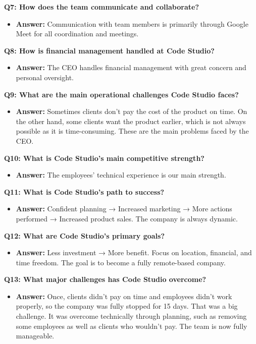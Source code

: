 \documentclass[12pt,a4paper]{article}
\begin{document}
\textbf{Q7: How does the team communicate and collaborate?}
\begin{itemize}
    \item \textbf{Answer:} Communication with team members is primarily through Google Meet for all coordination and meetings.
\end{itemize}

\textbf{Q8: How is financial management handled at Code Studio?}
\begin{itemize}
    \item \textbf{Answer:} The CEO handles financial management with great concern and personal oversight.
\end{itemize}

\textbf{Q9: What are the main operational challenges Code Studio faces?}
\begin{itemize}
    \item \textbf{Answer:} Sometimes clients don't pay the cost of the product on time. On the other hand, some clients want the product earlier, which is not always possible as it is time-consuming. These are the main problems faced by the CEO.
\end{itemize}

\textbf{Q10: What is Code Studio's main competitive strength?}
\begin{itemize}
    \item \textbf{Answer:} The employees' technical experience is our main strength.
\end{itemize}

\textbf{Q11: What is Code Studio's path to success?}
\begin{itemize}
    \item \textbf{Answer:} Confident planning → Increased marketing → More actions performed → Increased product sales. The company is always dynamic.
\end{itemize}

\textbf{Q12: What are Code Studio's primary goals?}
\begin{itemize}
    \item \textbf{Answer:} Less investment → More benefit. Focus on location, financial, and time freedom. The goal is to become a fully remote-based company.
\end{itemize}

\textbf{Q13: What major challenges has Code Studio overcome?}
\begin{itemize}
    \item \textbf{Answer:} Once, clients didn't pay on time and employees didn't work properly, so the company was fully stopped for 15 days. That was a big challenge. It was overcome technically through planning, such as removing some employees as well as clients who wouldn't pay. The team is now fully manageable.
\end{itemize}
\end{document}
